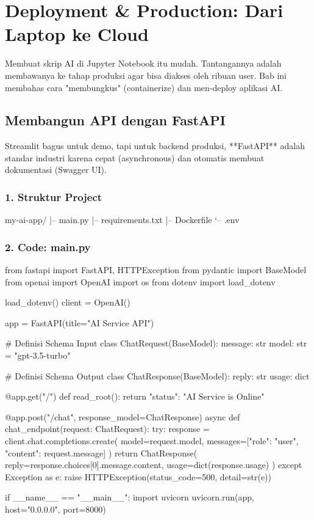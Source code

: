 \chapter{Deployment \& Production: Dari Laptop ke Cloud}
\label{chap:deployment}

Membuat skrip AI di Jupyter Notebook itu mudah. Tantangannya adalah membawanya ke tahap produksi agar bisa diakses oleh ribuan user. Bab ini membahas cara "membungkus" (containerize) dan men-deploy aplikasi AI.

\section{Membangun API dengan FastAPI}

Streamlit bagus untuk demo, tapi untuk backend produksi, **FastAPI** adalah standar industri karena cepat (asynchronous) dan otomatis membuat dokumentasi (Swagger UI).

\subsection{1. Struktur Project}
\begin{codeblock}
my-ai-app/
|-- main.py
|-- requirements.txt
|-- Dockerfile
`-- .env
\end{codeblock}

\subsection{2. Code: main.py}
\begin{codeblock}[language=Python]
from fastapi import FastAPI, HTTPException
from pydantic import BaseModel
from openai import OpenAI
import os
from dotenv import load_dotenv

load_dotenv()
client = OpenAI()

app = FastAPI(title="AI Service API")

# Definisi Schema Input
class ChatRequest(BaseModel):
    message: str
    model: str = "gpt-3.5-turbo"

# Definisi Schema Output
class ChatResponse(BaseModel):
    reply: str
    usage: dict

@app.get("/")
def read_root():
    return {"status": "AI Service is Online"}

@app.post("/chat", response_model=ChatResponse)
async def chat_endpoint(request: ChatRequest):
    try:
        response = client.chat.completions.create(
            model=request.model,
            messages=[{"role": "user", "content": request.message}]
        )
        return ChatResponse(
            reply=response.choices[0].message.content,
            usage=dict(response.usage)
        )
    except Exception as e:
        raise HTTPException(status_code=500, detail=str(e))

if __name__ == "__main__":
    import uvicorn
    uvicorn.run(app, host="0.0.0.0", port=8000)
\end{codeblock}

